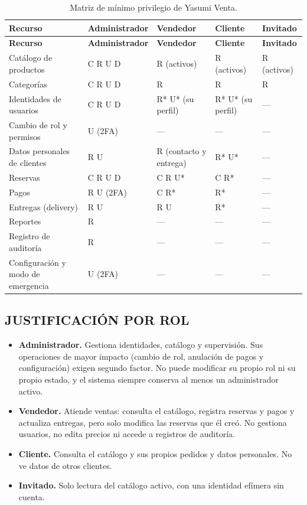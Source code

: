 \documentclass[12pt,letterpaper]{article}
\newenvironment{tabla}{\begin{singlespace}\small\setlength{\tabcolsep}{4pt}\renewcommand{\arraystretch}{1.15}}{\end{singlespace}}
\begin{document}
\begin{tabla}
\begin{longtable}{L{3.7cm}C{2.7cm}C{2.9cm}C{2.4cm}C{1.9cm}}
\caption{Matriz de mínimo privilegio de Yasumi Venta.}\label{tab:matriz}\\
\toprule
\textbf{Recurso} & \textbf{Administrador} & \textbf{Vendedor} & \textbf{Cliente} & \textbf{Invitado}\\
\midrule
\endfirsthead
\toprule
\textbf{Recurso} & \textbf{Administrador} & \textbf{Vendedor} & \textbf{Cliente} & \textbf{Invitado}\\
\midrule
\endhead
Catálogo de productos & C R U D & R (activos) & R (activos) & R (activos)\\
Categorías & C R U D & R & R & R\\
Identidades de usuarios & C R U D & R* U* (su perfil) & R* U* (su perfil) & ---\\
Cambio de rol y permisos & U (2FA) & --- & --- & ---\\
Datos personales de clientes & R U & R (contacto y entrega) & R* U* & ---\\
Reservas & C R U D & C R U* & C R* & ---\\
Pagos & R U (2FA) & C R* & R* & ---\\
Entregas (delivery) & R U & R U & R* & ---\\
Reportes & R & --- & --- & ---\\
Registro de auditoría & R & --- & --- & ---\\
Configuración y modo de emergencia & U (2FA) & --- & --- & ---\\
\bottomrule
\end{longtable}
\end{tabla}

\subsection{JUSTIFICACIÓN POR ROL}

\begin{itemize}
  \item \textbf{Administrador.} Gestiona identidades, catálogo y supervisión. Sus operaciones de mayor impacto (cambio de rol, anulación de pagos y configuración) exigen segundo factor. No puede modificar su propio rol ni su propio estado, y el sistema siempre conserva al menos un administrador activo.
  \item \textbf{Vendedor.} Atiende ventas: consulta el catálogo, registra reservas y pagos y actualiza entregas, pero solo modifica las reservas que él creó. No gestiona usuarios, no edita precios ni accede a registros de auditoría.
  \item \textbf{Cliente.} Consulta el catálogo y sus propios pedidos y datos personales. No ve datos de otros clientes.
  \item \textbf{Invitado.} Solo lectura del catálogo activo, con una identidad efímera sin cuenta.
\end{itemize}
\end{document}
